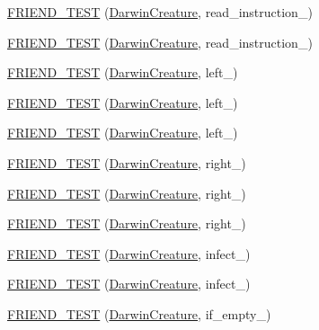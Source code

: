 \begin{DoxyCompactItemize}
\item 
\hyperlink{classCreature_a0158ecbd8f7a62e0b413d850bddd6101}{F\-R\-I\-E\-N\-D\-\_\-\-T\-E\-S\-T} (\hyperlink{classCreature_a16df2cdab1d993dc2dcb9db1b56dd808}{Darwin\-Creature}, read\-\_\-instruction\-\_)
\item 
\hyperlink{classCreature_a2a7e998b7a81bad58518f6b2944c50b1}{F\-R\-I\-E\-N\-D\-\_\-\-T\-E\-S\-T} (\hyperlink{classCreature_a16df2cdab1d993dc2dcb9db1b56dd808}{Darwin\-Creature}, read\-\_\-instruction\-\_)
\item 
\hyperlink{classCreature_a711097119435dcc3106749e6a1834cbb}{F\-R\-I\-E\-N\-D\-\_\-\-T\-E\-S\-T} (\hyperlink{classCreature_a16df2cdab1d993dc2dcb9db1b56dd808}{Darwin\-Creature}, left\-\_)
\item 
\hyperlink{classCreature_a1e7c74656efdd2547e8c62beff4c4d22}{F\-R\-I\-E\-N\-D\-\_\-\-T\-E\-S\-T} (\hyperlink{classCreature_a16df2cdab1d993dc2dcb9db1b56dd808}{Darwin\-Creature}, left\-\_)
\item 
\hyperlink{classCreature_a51a30233f937da95b54dbefa38ce4926}{F\-R\-I\-E\-N\-D\-\_\-\-T\-E\-S\-T} (\hyperlink{classCreature_a16df2cdab1d993dc2dcb9db1b56dd808}{Darwin\-Creature}, left\-\_)
\item 
\hyperlink{classCreature_ac7ecc44685459711734d7d98ffaba37e}{F\-R\-I\-E\-N\-D\-\_\-\-T\-E\-S\-T} (\hyperlink{classCreature_a16df2cdab1d993dc2dcb9db1b56dd808}{Darwin\-Creature}, right\-\_)
\item 
\hyperlink{classCreature_aa8f3b768b6e2619443e4ab227eba10cc}{F\-R\-I\-E\-N\-D\-\_\-\-T\-E\-S\-T} (\hyperlink{classCreature_a16df2cdab1d993dc2dcb9db1b56dd808}{Darwin\-Creature}, right\-\_)
\item 
\hyperlink{classCreature_a29aae915b0e492e436116df61971e114}{F\-R\-I\-E\-N\-D\-\_\-\-T\-E\-S\-T} (\hyperlink{classCreature_a16df2cdab1d993dc2dcb9db1b56dd808}{Darwin\-Creature}, right\-\_)
\item 
\hyperlink{classCreature_a0a17ad8abb1413af9072c569ae5f7be5}{F\-R\-I\-E\-N\-D\-\_\-\-T\-E\-S\-T} (\hyperlink{classCreature_a16df2cdab1d993dc2dcb9db1b56dd808}{Darwin\-Creature}, infect\-\_)
\item 
\hyperlink{classCreature_aa48d715e121a755c77fd184c7c93f6f8}{F\-R\-I\-E\-N\-D\-\_\-\-T\-E\-S\-T} (\hyperlink{classCreature_a16df2cdab1d993dc2dcb9db1b56dd808}{Darwin\-Creature}, infect\-\_)
\item 
\hyperlink{classCreature_a305d77502a26b7b1c18a485ec5ca73ed}{F\-R\-I\-E\-N\-D\-\_\-\-T\-E\-S\-T} (\hyperlink{classCreature_a16df2cdab1d993dc2dcb9db1b56dd808}{Darwin\-Creature}, if\-\_\-empty\-\_)

\end{DoxyCompactItemize}
